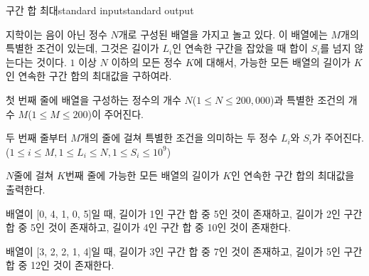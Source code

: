 \begin{problem}{구간 합 최대}{standard input}{standard output}

지학이는 음이 아닌 정수 $N$개로 구성된 배열을 가지고 놀고 있다. 이 배열에는 $M$개의 특별한 조건이 있는데, 그것은 길이가 $L_i$인 연속한 구간을 잡았을 때 합이 $S_i$를 넘지 않는다는 것이다. $1$ 이상 $N$ 이하의 모든 정수 $K$에 대해서, 가능한 모든 배열의 길이가 $K$인 연속한 구간 합의 최대값을 구하여라.

\InputFile
첫 번째 줄에 배열을 구성하는 정수의 개수 $N$($1 \le N \le 200,000$)과 특별한 조건의 개수 $M$($1 \le M \le 200$)이 주어진다.

두 번째 줄부터 $M$개의 줄에 걸쳐 특별한 조건을 의미하는 두 정수 $L_i$와 $S_i$가 주어진다. ($1 \le i \le M, 1 \le L_i \le N, 1 \le S_i \le 10^9$)

\OutputFile
$N$줄에 걸쳐 $K$번째 줄에 가능한 모든 배열의 길이가 $K$인 연속한 구간 합의 최대값을 출력한다.

\Example

\begin{example}
%
\end{example}

\Notes

배열이 [0, 4, 1, 0, 5]일 때, 길이가 1인 구간 합 중 5인 것이 존재하고, 길이가 2인 구간 합 중 5인 것이 존재하고, 길이가 4인 구간 합 중 10인 것이 존재한다.

배열이 [3, 2, 2, 1, 4]일 때, 길이가 3인 구간 합 중 7인 것이 존재하고, 길이가 5인 구간 합 중 12인 것이 존재한다.

\end{problem}
